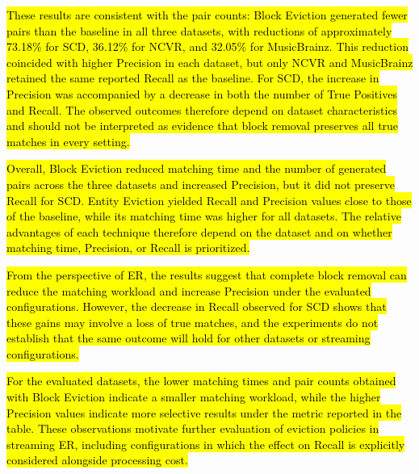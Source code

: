 \documentclass{ieeeaccess}
\begin{document}
\hl{These results are consistent with the pair counts: Block Eviction generated fewer pairs than the baseline in all three datasets, with reductions of approximately 73.18\% for SCD, 36.12\% for NCVR, and 32.05\% for MusicBrainz. This reduction coincided with higher Precision in each dataset, but only NCVR and MusicBrainz retained the same reported Recall as the baseline. For SCD, the increase in Precision was accompanied by a decrease in both the number of True Positives and Recall. The observed outcomes therefore depend on dataset characteristics and should not be interpreted as evidence that block removal preserves all true matches in every setting.}

\hl{Overall, Block Eviction reduced matching time and the number of generated pairs across the three datasets and increased Precision, but it did not preserve Recall for SCD. Entity Eviction yielded Recall and Precision values close to those of the baseline, while its matching time was higher for all datasets. The relative advantages of each technique therefore depend on the dataset and on whether matching time, Precision, or Recall is prioritized.}

\hl{From the perspective of ER, the results suggest that complete block removal can reduce the matching workload and increase Precision under the evaluated configurations. However, the decrease in Recall observed for SCD shows that these gains may involve a loss of true matches, and the experiments do not establish that the same outcome will hold for other datasets or streaming configurations.}

\hl{For the evaluated datasets, the lower matching times and pair counts obtained with Block Eviction indicate a smaller matching workload, while the higher Precision values indicate more selective results under the metric reported in the table. These observations motivate further evaluation of eviction policies in streaming ER, including configurations in which the effect on Recall is explicitly considered alongside processing cost.}
\end{document}

